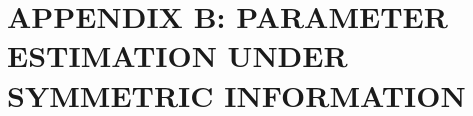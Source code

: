 \documentclass[12pt]{article}
\theoremstyle{definition}
\theoremstyle{definition}
\begin{document}
\section*{APPENDIX B: PARAMETER ESTIMATION UNDER SYMMETRIC INFORMATION}
\label{appendixB}
%
\end{document}
